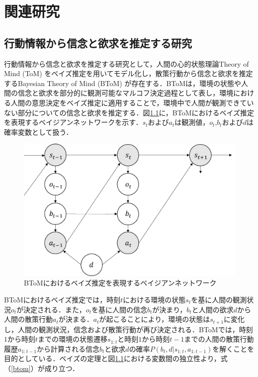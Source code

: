 \chapter{関連研究}

\section{行動情報から信念と欲求を推定する研究}
\par
行動情報から信念と欲求を推定する研究として，人間の心的状態理論Theory of Mind (ToM) \cite{子安増生1997心の理論}をベイズ推定を用いてモデル化し，散策行動から信念と欲求を推定するBayesian Theory of Mind (BToM) \cite{baker2011bayesian}が存在する．BToMは，環境の状態や人間の信念と欲求を部分的に観測可能なマルコフ決定過程\cite{alma9926438829904034}として表し，環境における人間の意思決定をベイズ推定に適用することで，環境中で人間が観測できていない部分についての信念と欲求を推定する．図\ref{fig:btom}に，BToMにおけるベイズ推定を表現するベイジアンネットワーク\cite{alma9926301926204034}を示す．$s_t$および$a_t$は観測値，$o_t$,$b_t$および$d$は確率変数として扱う．
\begin{figure}[htbp]
  \begin{center}
    \includegraphics[scale=0.7]{./btom.pdf}
    \caption{BToMにおけるベイズ推定を表現するベイジアンネットワーク}
    \label{fig:btom}
  \end{center}
\end{figure}
BToMにおけるベイズ推定では，時刻$t$における環境の状態$s_{t}$を基に人間の観測状況$o_{t}$が決定される．また，$o_{t}$を基に人間の信念$b_{t}$が決まり，$b_{t}$と人間の欲求$d$から人間の散策行動$a_{t}$が決まる．$a_{t}$が起こることにより，環境の状態は$s_{t+1}$に変化し，人間の観測状況，信念および散策行動が再び決定される．BToMでは，時刻$1$から時刻$t$までの環境の状態遷移$s_{1:t}$と時刻$1$から時刻$t-1$までの人間の散策行動履歴$a_{1:t-1}$から計算される信念$b_t$と欲求$d$の確率$P(b_t,d|s_{1:t},a_{1:t-1})$を解くことを目的としている．ベイズの定理\cite{ベイズ}と図\ref{fig:btom}における変数間の独立性\cite{ベイズ}より，式（\ref{btom}）が成り立つ．
